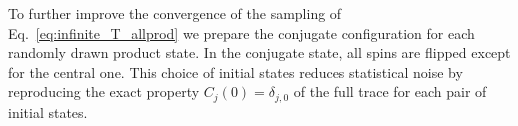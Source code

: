 \documentclass[aps,10pt,reprint,groupedaddress,superscriptaddress]{revtex4-2}
\begin{document}
To further improve the convergence of the sampling of Eq.~\eqref{eq:infinite_T_allprod} we prepare the conjugate configuration for each randomly drawn product state. In the conjugate state, all spins are flipped except for the central one. This choice of initial states reduces statistical noise by reproducing the exact property $C_j(0)=\delta_{j,0}$ of the full trace for each pair of initial states.


\end{document}
